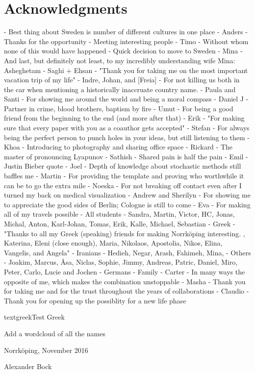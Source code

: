 \chapter*{Acknowledgments}

  - Best thing about Sweden is number of different cultures in one place
  - Anders
      - Thanks for the opportunity 
      - Meeting interesting people
  - Timo
      - Without whom none of this would have happened
      - Quick decision to move to Sweden
  - Mina
      - And last, but definitely not least, to my incredibly understanding wife Mina: Asheghetam
  - Saghi + Ehsan
      - "Thank you for taking me on the most important vacation trip of my life"
  - Indre, Johan, and [Freia]
      - For not killing us both in the car when mentioning a historically inaccruate country name. 
  - Paula and Santi
      - For showing me around the world and being a moral compass
  - Daniel J
      - Partner in crime, blood brothers, baptism by fire
  - Umut
      - For being a good friend from the beginning to the end (and more after that)
  - Erik
      - "For making sure that every paper with you as a coauthor gets accepted"
  - Stefan
      - For always being the perfect person to punch holes in your ideas, but still listening to them
  - Khoa
      - Introducing to photography and sharing office space
  - Rickard
    - The master of pronouncing Lyapunov
  - Sathish
      - Shared pain is half the pain
  - Emil
      - Justin Bieber quote
  - Joel
      - Depth of knowledge about stochastic methods still baffles me
  - Martin
      - For providing the template and proving who worthwhile it can be to go the extra mile
  - Noeska
      - For not breaking off contact even after I turned my back on medical visualization
  - Andrew and Sherilyn
      - For showing me to appreciate the good sides of Berlin; Cologne is still to come
  - Eva
      - For making all of my travels possible
  - All students
      - Sandra, Martin, Victor, HC, Jonas, Michal, Anton, Karl-Johan, Tomas, Erik, Kalle, Michael, Sebastian
  - Greek
      - "Thanks to all my Greek (speaking) friends for making Norrköping interesting. , Katerina, Eleni (close enough), Maria, Nikolaos, Apostolia, Nikos, Elina, Vangelis, and Angela"
  - Iranians
      - Hedieh, Negar, Arash, Fahimeh, Mina, 
  - Others
      - Joakim, Marcus, Åsa, Niclas, Sophie, Jimmy, Andreas, Patric, Daniel, Miro, Peter, Carlo, Lucie and Jochen
  - Germans
      - Family
  - Carter
      - In many ways the opposite of me, which makes the combination unstoppable
  - Masha
      - Thank you for taking me and for the trust throughout the years of collaborations
  - Claudio
      - Thank you for opening up the possiblity for a new life phase
      
textgreek{Test Greek}  


Add a wordcloud of all the names

\hline

Norrk\"oping, November 2016

Alexander Bock
